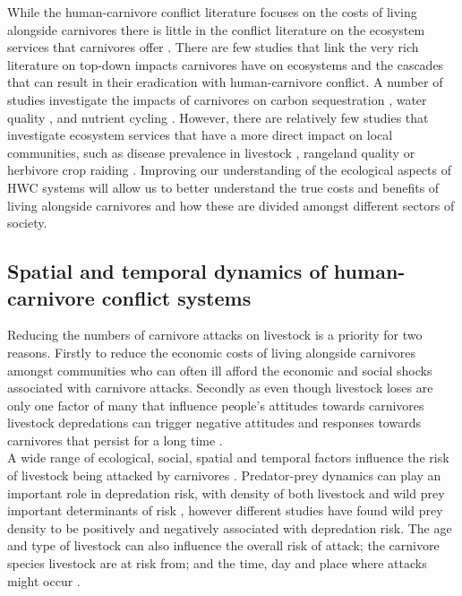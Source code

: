 While the human-carnivore conflict literature focuses on the costs of living alongside carnivores there is little in the conflict literature on the ecosystem services that carnivores offer \cite{Ripple2014a}. There are few studies that link the very rich literature on top-down impacts carnivores have on ecosystems and the cascades that can result in their eradication \cite{Ripple2014,Crooks1999a,Ripple2014a} with human-carnivore conflict. A number of studies investigate the impacts of carnivores on carbon sequestration \cite{Wilmers2012,Schmitz2014}, water quality \cite{Beschta2012a}, and nutrient cycling \cite{Wilmers2003}. However, there are relatively few studies that investigate ecosystem services that have a more direct impact on local communities, such as disease prevalence in livestock \cite{Packer2003}, rangeland quality \cite{Prowse2014,Allen2015a} or herbivore crop raiding \cite{brashares2010ecological}. Improving our understanding of the ecological aspects of HWC systems will allow us to better understand the true costs and benefits of living alongside carnivores and how these are divided amongst different sectors of society.

\subsection{Spatial and temporal dynamics of human-carnivore conflict systems}

Reducing the numbers of carnivore attacks on livestock is a priority for two reasons. Firstly to reduce the economic costs of living alongside carnivores amongst communities who can often ill afford the economic and social shocks associated with carnivore attacks. Secondly as even though livestock loses are only one factor of many that influence people's attitudes towards carnivores \cite{Dickman2010b,Inskip2016,Bruskotter2014d} livestock depredations can trigger negative attitudes and responses towards carnivores that persist for a long time \cite{Marker2003,Dickman2014d}.\\

A wide range of ecological, social, spatial and temporal factors influence the risk of livestock being attacked by carnivores \cite{Miller2015}. Predator-prey dynamics can play an important role in depredation risk, with density of both livestock and wild prey important determinants of risk \cite{Hemson2003,Zarco-Gonzalez2013}, however different studies have found wild prey density to be positively \cite{Kolowski2006,Treves2015,Zarco-Gonzalez2013} and negatively \cite{Hemson2003} associated with depredation risk. The age and type of livestock can also influence the overall risk of attack; the carnivore species livestock are at risk from; and the time, day and place where attacks might occur \cite{DeAzevedo2007,Ogada2003}. \\

